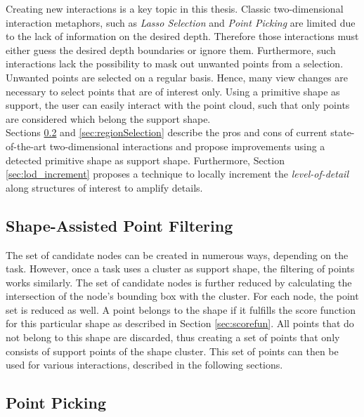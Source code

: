 Creating new interactions is a key topic in this thesis. Classic two-dimensional interaction metaphors, such as \textit{Lasso Selection} and \textit{Point Picking} are limited due to the lack of information on the desired depth. Therefore those interactions must either guess the desired depth boundaries or ignore them. Furthermore, such interactions lack the possibility to mask out unwanted points from a selection. Unwanted points are selected on a regular basis. Hence, many view changes are necessary to select points that are of interest only. Using a primitive shape as support, the user can easily interact with the point cloud, such that only points are considered which belong the support shape. 
\\
Sections \ref{sec:pointPicking} and \ref{sec:regionSelection} describe the pros and cons of current state-of-the-art two-dimensional interactions and propose improvements using a detected primitive shape as support shape. Furthermore, Section \ref{sec:lod_increment} proposes a technique to locally increment the \textit{level-of-detail} along structures of interest to amplify details. 


\subsection{Shape-Assisted Point Filtering}
\label{sec:pointFiltering}

The set of candidate nodes can be created in numerous ways, depending on the task. However, once a task uses a cluster as support shape, the filtering of points works similarly. The set of candidate nodes is further reduced by calculating the intersection of the node's bounding box with the cluster. For each node, the point set is reduced as well. A point belongs to the shape if it fulfills the score function for this particular shape as described in Section \ref{sec:scorefun}. All points that do not belong to this shape are discarded, thus creating a set of points that only consists of support points of the shape cluster. This set of points can then be used for various interactions, described in the following sections. 


\subsection{Point Picking}
\label{sec:pointPicking}

